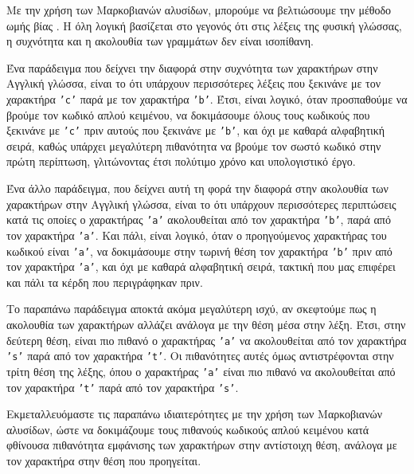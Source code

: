 \documentclass[11pt]{article}
\begin{document}
Με την χρήση των Μαρκοβιανών αλυσίδων, μπορούμε να βελτιώσουμε την μέθοδο ωμής βίας \cite{trustwave:hashcat_per_position_markov_chains}. Η όλη λογική βασίζεται στο γεγονός ότι στις λέξεις της φυσική γλώσσας, η συχνότητα και η ακολουθία των γραμμάτων δεν είναι ισοπίθανη.

Ένα παράδειγμα που δείχνει την διαφορά στην συχνότητα των χαρακτήρων στην Αγγλική γλώσσα\footnotemark, είναι το ότι υπάρχουν περισσότερες λέξεις που ξεκινάνε με τον χαρακτήρα \texttt{'c'} παρά με τον χαρακτήρα \texttt{'b'}. Έτσι, είναι λογικό, όταν προσπαθούμε να βρούμε τον κωδικό απλού κειμένου, να δοκιμάσουμε όλους τους κωδικούς που ξεκινάνε με \texttt{'c'} πριν αυτούς που ξεκινάνε με \texttt{'b'}, και όχι με καθαρά αλφαβητική σειρά, καθώς υπάρχει μεγαλύτερη πιθανότητα να βρούμε τον σωστό κωδικό στην πρώτη περίπτωση, γλιτώνοντας έτσι πολύτιμο χρόνο και υπολογιστικό έργο.

Ένα άλλο παράδειγμα, που δείχνει αυτή τη φορά την διαφορά στην ακολουθία των χαρακτήρων στην Αγγλική γλώσσα\footnotemark[\value{footnote}], είναι το ότι υπάρχουν περισσότερες περιπτώσεις κατά τις οποίες ο χαρακτήρας \texttt{'a'} ακολουθείται από τον χαρακτήρα \texttt{'b'}, παρά από τον χαρακτήρα \texttt{'a'}. Και πάλι, είναι λογικό, όταν ο προηγούμενος χαρακτήρας του κωδικού είναι \texttt{'a'}, να δοκιμάσουμε στην τωρινή θέση τον χαρακτήρα \texttt{'b'} πριν από τον χαρακτήρα \texttt{'a'}, και όχι με καθαρά αλφαβητική σειρά, τακτική που μας επιφέρει και πάλι τα κέρδη που περιγράφηκαν πριν.

Το παραπάνω παράδειγμα αποκτά ακόμα μεγαλύτερη ισχύ, αν σκεφτούμε πως η ακολουθία των χαρακτήρων αλλάζει ανάλογα με την θέση μέσα στην λέξη\footnotemark[\value{footnote}]. Έτσι, στην δεύτερη θέση, είναι πιο πιθανό ο χαρακτήρας \texttt{'a'} να ακολουθείται από τον χαρακτήρα \texttt{'s'} παρά από τον χαρακτήρα \texttt{'t'}. Οι πιθανότητες αυτές όμως αντιστρέφονται στην τρίτη θέση της λέξης, όπου ο χαρακτήρας \texttt{'a'} είναι πιο πιθανό να ακολουθείται από τον χαρακτήρα \texttt{'t'} παρά από τον χαρακτήρα \texttt{'s'}.


Εκμεταλλευόμαστε τις παραπάνω ιδιαιτερότητες με την χρήση των Μαρκοβιανών αλυσίδων, ώστε να δοκιμάζουμε τους πιθανούς κωδικούς απλού κειμένου κατά φθίνουσα πιθανότητα εμφάνισης των χαρακτήρων στην αντίστοιχη θέση, ανάλογα με τον χαρακτήρα στην θέση που προηγείται.
\end{document}
